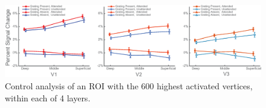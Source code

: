 \begin{figure}[!ht]
\centering
\includegraphics[width=1.0\textwidth, clip=true]{./Chapters/04_Attention/Images/SM_LayerResults_4Layers}
\caption{Control analysis of an ROI with the 600 highest activated vertices, within each of 4 layers.}
\label{fig:layerresults4layers}
\end{figure}